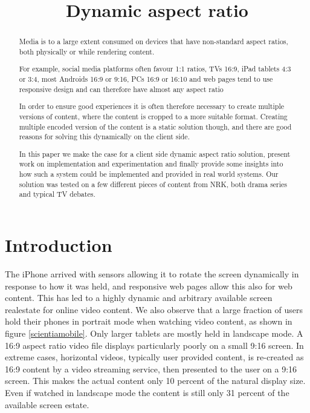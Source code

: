 \documentclass[sigconf, review=true]{acmart}
\title{Dynamic aspect ratio}
\begin{document}

 
\begin{abstract}


Media is to a large extent consumed on devices that have non-standard aspect
ratios, both physically or while rendering content. 

For example, social media platforms often favour 1:1 ratios, TVs 16:9, iPad
tablets 4:3 or 3:4, most Androids 16:9 or 9:16, PCs 16:9 or 16:10 and web
pages tend to use responsive design and can therefore have almost any aspect
ratio

In order to ensure good experiences it is often therefore necessary to create
multiple versions of content, where the content is cropped to a more suitable
format. Creating multiple encoded version of the content is a static solution
though, and there are good reasons for solving this dynamically on the client
side. 

In this paper we make the case for a client side dynamic aspect ratio
solution, present work on implementation and experimentation and finally
provide some insights into how such a system could be implemented and
provided in real world systems. Our solution was tested on a few different
pieces of content from NRK, both drama series and typical TV debates.

\end{abstract}

\maketitle

\section{Introduction}\label{introduction}

The iPhone arrived with sensors allowing it to rotate the screen dynamically
in response to how it was held, and responsive web pages allow this also for
web content. This has led to a highly dynamic and arbitrary available screen
realestate for online video content. We also observe that a large fraction of
users hold their phones in portrait mode when watching video content, as
shown in figure \ref{scientiamobile}. Only larger tablets are mostly held in
landscape mode. A 16:9 aspect ratio video file displays particularly poorly
on a small 9:16 screen. In extreme cases, horizontal videos, typically user
provided content, is re-created as 16:9 content by a video streaming service,
then presented to the user on a 9:16 screen. This makes the actual content
only 10 percent of the natural display size. Even if watched in landscape
mode the content is still only 31 percent of the available screen estate. 
\end{document}
